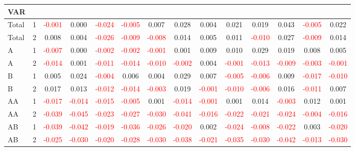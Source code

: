 \begin{table}[H]
{\begin{tabular}{llcccccccccccc}
\hline
VAR &  &  &  &  &  &  &  &  &  &  &  &  & \\
\hline
Total & 1 & \textcolor{red}{-0.001} & 0.000 & \textcolor{red}{-0.024} & \textcolor{red}{-0.005} & 0.007 & 0.028 & 0.004 & 0.021 & 0.019 & 0.043 & \textcolor{red}{-0.005} & 0.022\\
Total & 2 & 0.008 & 0.004 & \textcolor{red}{-0.026} & \textcolor{red}{-0.009} & \textcolor{red}{-0.008} & 0.014 & 0.005 & 0.011 & \textcolor{red}{-0.010} & 0.027 & \textcolor{red}{-0.009} & 0.014\\
A & 1 & \textcolor{red}{-0.007} & 0.000 & \textcolor{red}{-0.002} & \textcolor{red}{-0.002} & \textcolor{red}{-0.001} & 0.001 & 0.009 & 0.010 & 0.029 & 0.019 & 0.008 & 0.005\\
A & 2 & \textcolor{red}{-0.014} & 0.001 & \textcolor{red}{-0.011} & \textcolor{red}{-0.014} & \textcolor{red}{-0.010} & \textcolor{red}{-0.002} & 0.004 & \textcolor{red}{-0.001} & \textcolor{red}{-0.013} & \textcolor{red}{-0.009} & \textcolor{red}{-0.003} & \textcolor{red}{-0.001}\\
B & 1 & 0.005 & 0.024 & \textcolor{red}{-0.004} & 0.006 & 0.004 & 0.029 & 0.007 & \textcolor{red}{-0.005} & \textcolor{red}{-0.006} & 0.009 & \textcolor{red}{-0.017} & \textcolor{red}{-0.010}\\
B & 2 & 0.017 & 0.013 & \textcolor{red}{-0.012} & \textcolor{red}{-0.014} & \textcolor{red}{-0.003} & 0.019 & \textcolor{red}{-0.001} & \textcolor{red}{-0.010} & \textcolor{red}{-0.006} & 0.016 & \textcolor{red}{-0.011} & 0.007\\
AA & 1 & \textcolor{red}{-0.017} & \textcolor{red}{-0.014} & \textcolor{red}{-0.015} & \textcolor{red}{-0.005} & 0.001 & \textcolor{red}{-0.014} & \textcolor{red}{-0.001} & 0.001 & 0.014 & \textcolor{red}{-0.003} & 0.012 & 0.001\\
AA & 2 & \textcolor{red}{-0.039} & \textcolor{red}{-0.045} & \textcolor{red}{-0.023} & \textcolor{red}{-0.027} & \textcolor{red}{-0.030} & \textcolor{red}{-0.041} & \textcolor{red}{-0.016} & \textcolor{red}{-0.022} & \textcolor{red}{-0.021} & \textcolor{red}{-0.024} & \textcolor{red}{-0.004} & \textcolor{red}{-0.016}\\
AB & 1 & \textcolor{red}{-0.039} & \textcolor{red}{-0.042} & \textcolor{red}{-0.019} & \textcolor{red}{-0.036} & \textcolor{red}{-0.026} & \textcolor{red}{-0.020} & 0.002 & \textcolor{red}{-0.024} & \textcolor{red}{-0.008} & \textcolor{red}{-0.022} & 0.003 & \textcolor{red}{-0.020}\\
AB & 2 & \textcolor{red}{-0.025} & \textcolor{red}{-0.030} & \textcolor{red}{-0.020} & \textcolor{red}{-0.028} & \textcolor{red}{-0.030} & \textcolor{red}{-0.038} & \textcolor{red}{-0.021} & \textcolor{red}{-0.035} & \textcolor{red}{-0.030} & \textcolor{red}{-0.042} & \textcolor{red}{-0.013} & \textcolor{red}{-0.030}\\

\end{tabular}}
\end{table}
